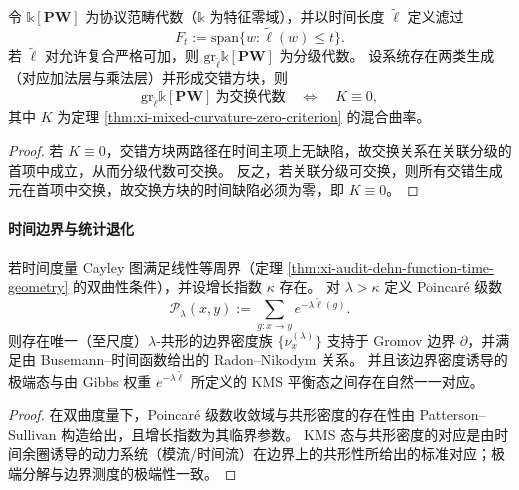 \begin{theorem}\label{thm:xi-time-filtration-pbw-graded-commutative}
令 \(\mathbb k[\mathbf{PW}]\) 为协议范畴代数（\(\mathbb k\) 为特征零域），并以时间长度 \(\widetilde{\ell}\) 定义滤过
\[
F_t:=\mathrm{span}\{w:\widetilde{\ell}(w)\le t\}.
\]
若 \(\widetilde{\ell}\) 对允许复合严格可加，则 \(\mathrm{gr}_{\widetilde{\ell}}\mathbb k[\mathbf{PW}]\) 为分级代数。
设系统存在两类生成（对应加法层与乘法层）并形成交错方块，则
\[
\mathrm{gr}_{\widetilde{\ell}}\mathbb k[\mathbf{PW}]\ \text{为交换代数}
\quad\Longleftrightarrow\quad
K\equiv 0,
\]
其中 \(K\) 为定理 \ref{thm:xi-mixed-curvature-zero-criterion} 的混合曲率。
\end{theorem}

\begin{proof}
若 \(K\equiv 0\)，交错方块两路径在时间主项上无缺陷，故交换关系在关联分级的首项中成立，从而分级代数可交换。
反之，若关联分级可交换，则所有交错生成元在首项中交换，故交换方块的时间缺陷必须为零，即 \(K\equiv 0\)。
\end{proof}

\paragraph{时间边界与统计退化}

\begin{theorem}\label{thm:xi-time-boundary-patterson-sullivan-kms}
若时间度量 Cayley 图满足线性等周界（定理 \ref{thm:xi-audit-dehn-function-time-geometry} 的双曲性条件），并设增长指数 \(\kappa\) 存在。
对 \(\lambda>\kappa\) 定义 Poincar\'e 级数
\[
\mathcal P_\lambda(x,y):=\sum_{g:x\to y}e^{-\lambda \widetilde{\ell}(g)}.
\]
则存在唯一（至尺度）\(\lambda\)-共形的边界密度族 \(\{\nu_x^{(\lambda)}\}\) 支持于 Gromov 边界 \(\partial\)，并满足由 Busemann--时间函数给出的 Radon--Nikodym 关系。
并且该边界密度诱导的极端态与由 Gibbs 权重 \(e^{-\lambda\widetilde{\ell}}\) 所定义的 KMS 平衡态之间存在自然一一对应。
\end{theorem}

\begin{proof}
在双曲度量下，Poincar\'e 级数收敛域与共形密度的存在性由 Patterson--Sullivan 构造给出，且增长指数为其临界参数。
KMS 态与共形密度的对应是由时间余圈诱导的动力系统（模流/时间流）在边界上的共形性所给出的标准对应；极端分解与边界测度的极端性一致。
\end{proof}

